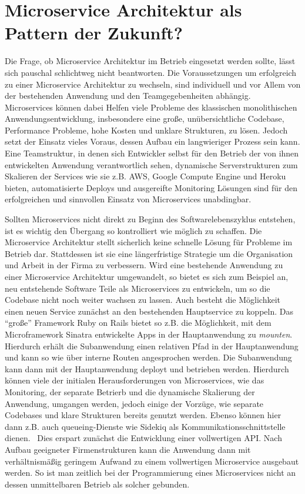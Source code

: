 \chapter{Microservice Architektur als Pattern der Zukunft?}

Die Frage, ob Microservice Architektur im Betrieb eingesetzt werden sollte, lässt sich pauschal schlichtweg nicht beantworten. Die Voraussetzungen um erfolgreich zu einer Microservice Architektur zu wechseln, sind individuell und vor Allem von der bestehenden Anwendung und den Teamgegebenheiten abhängig. Microservices können dabei Helfen viele Probleme des klassischen monolithischen Anwendungsentwicklung, insbesondere eine große, unübersichtliche Codebase, Performance Probleme, hohe Kosten und unklare Strukturen, zu lösen. Jedoch setzt der Einsatz vieles Voraus, dessen Aufbau ein langwieriger Prozess sein kann. Eine Teamstruktur, in denen sich Entwickler selbst für den Betrieb der von ihnen entwickelten Anwendung verantwortlich sehen, dynamische Serverstrukturen  zum Skalieren der Services wie sie z.B. AWS, Google Compute Engine und Heroku bieten, automatisierte Deploys und ausgereifte Monitoring Lösungen sind für den erfolgreichen und sinnvollen Einsatz von Microservices unabdingbar.

Sollten Microservices nicht direkt zu Beginn des Softwarelebenszyklus entstehen, ist es wichtig den Übergang so kontrolliert wie möglich zu schaffen. Die Microservice Architektur stellt sicherlich keine schnelle Lösung für Probleme im Betrieb dar. Stattdessen ist sie eine längerfristige Strategie um die Organisation und Arbeit in der Firma zu verbessern.\cite{newman2015building} Wird eine bestehende Anwendung zu einer Microservice Architektur umgewandelt, so bietet es sich zum Beispiel an, neu entstehende Software Teile als Microservices zu entwickeln, um so die Codebase nicht noch weiter wachsen zu lassen. Auch besteht die Möglichkeit einen neuen Service zunächst an den bestehenden Hauptservice zu koppeln. Das ``große'' Framework Ruby on Rails bietet so z.B. die Möglichkeit, mit dem Microframework Sinatra entwickelte Apps in der Hauptanwendung zu \textit{mounten}. Hierdurch erhält die Subanwendung einen relativen Pfad in der Hauptanwendung und kann so wie über interne Routen angesprochen werden. Die Subanwendung kann dann mit der Hauptanwendung deployt und betrieben werden. Hierdurch können viele der initialen Herausforderungen von Microservices, wie das Monitoring, der separate Betrierb und die dynamische Skalierung der Anwendung, umgangen werden, jedoch einige der Vorzüge, wie separate Codebases und klare Strukturen bereits genutzt werden. Ebenso können hier dann z.B. auch queueing-Dienste wie Sidekiq als Kommunikationsschnittstelle dienen.~\cite[vgl.][]{sidekiqmessaging} Dies erspart zunächst die Entwicklung einer vollwertigen API. Nach Aufbau geeigneter Firmenstrukturen kann die Anwendung dann mit verhältnismäßig geringem Aufwand zu einem vollwertigen Microservice ausgebaut werden. So ist man zeitlich bei der Programmierung eines Microservices nicht an dessen unmittelbaren Betrieb als solcher gebunden.

